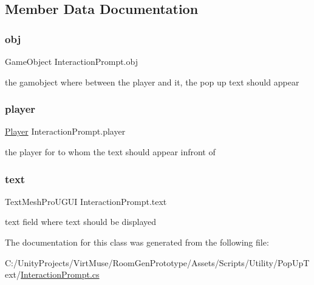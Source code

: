 \subsection{Member Data Documentation}
\mbox{\label{class_interaction_prompt_a2ede1aad42e153f5b4a3fafe4233e8be}} 
\subsubsection{\texorpdfstring{obj}{obj}}
{\footnotesize\ttfamily Game\+Object Interaction\+Prompt.\+obj\hspace{0.3cm}{\ttfamily [private]}}



the gamobject where between the player and it, the pop up text should appear 

\mbox{\label{class_interaction_prompt_a4fbdf117c9d51678d8e74c32b04e206a}} 
\subsubsection{\texorpdfstring{player}{player}}
{\footnotesize\ttfamily \mbox{\hyperlink{class_player}{Player}} Interaction\+Prompt.\+player\hspace{0.3cm}{\ttfamily [private]}}



the player for to whom the text should appear infront of 

\mbox{\label{class_interaction_prompt_a4636f2a267626c679099028ef84aecf7}} 
\subsubsection{\texorpdfstring{text}{text}}
{\footnotesize\ttfamily Text\+Mesh\+Pro\+U\+G\+UI Interaction\+Prompt.\+text\hspace{0.3cm}{\ttfamily [private]}}



text field where text should be displayed 



The documentation for this class was generated from the following file\+:\begin{DoxyCompactItemize}
\item 
C\+:/\+Unity\+Projects/\+Virt\+Muse/\+Room\+Gen\+Prototype/\+Assets/\+Scripts/\+Utility/\+Pop\+Up\+Text/\mbox{\hyperlink{_interaction_prompt_8cs}{Interaction\+Prompt.\+cs}}\end{DoxyCompactItemize}
